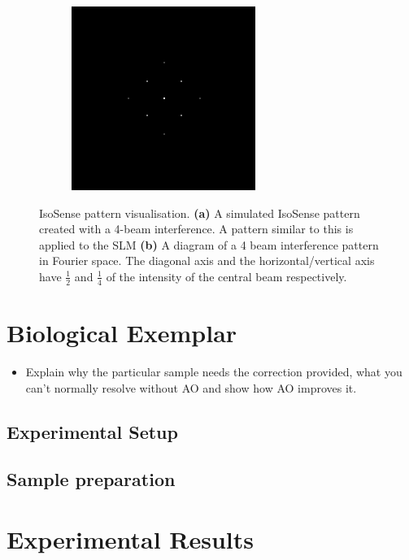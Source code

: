 \begin{figure}[h]
\begin{subfigure}{0.4\textwidth}
		\includegraphics[width=1\linewidth, scale=0.5]{./images/isosense_visualisation_ft.png}
		\caption{}
		\label{fig:isosense_visualisation_ft}
	\end{subfigure}
	\caption[IsoSense pattern visualisation.]{IsoSense pattern visualisation. \textbf{(a)} A simulated IsoSense pattern created with a 4-beam interference. A pattern similar to this is applied to the SLM \textbf{(b)} A diagram of a 4 beam interference pattern in Fourier space. The diagonal axis and the horizontal/vertical axis have $\frac{1}{2}$ and $\frac{1}{4}$ of the intensity of the central beam respectively.}
	\label{fig:isosense_visualisation}
\end{figure}

\section{Biological Exemplar}
\label{sec:SIM_biology}

\begin{itemize}
	\item Explain why the particular sample needs the correction provided, what you can't normally resolve without AO and show how  AO improves it.
\end{itemize}

\subsection{Experimental Setup}
\label{subsec:SIM_setup}

\subsection{Sample preparation}
\label{subsec:SIM_sample_prep}

\section{Experimental Results}
\label{sec:SIM_results}
